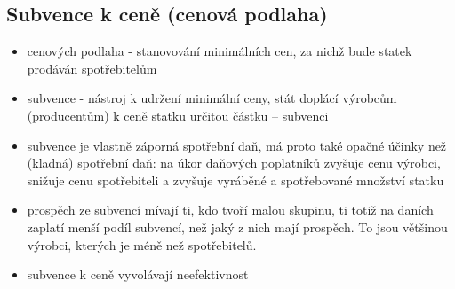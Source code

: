 \subsection{Subvence k ceně (cenová podlaha)}
\begin{itemize}
    \item cenových podlaha - stanovování minimálních cen, za nichž bude statek prodáván spotřebitelům
    \item subvence - nástroj k udržení minimální ceny, stát doplácí výrobcům (producentům) k ceně statku
    určitou částku – subvenci
    \item subvence je vlastně záporná spotřební daň, má proto také opačné účinky než (kladná) spotřební daň: 
    na úkor daňových poplatníků zvyšuje cenu výrobci, snižuje cenu spotřebiteli a zvyšuje vyráběné
    a spotřebované množství statku
    \item prospěch ze subvencí mívají ti, kdo tvoří malou skupinu, ti totiž na daních zaplatí menší podíl 
    subvencí, než jaký z nich mají prospěch. To jsou většinou výrobci, kterých je méně než spotřebitelů.
    \item subvence k ceně vyvolávají neefektivnost
\end{itemize}
